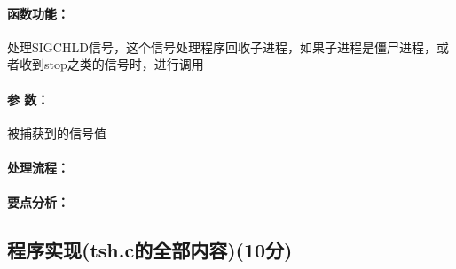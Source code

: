 \paragraph{函数功能：}处理SIGCHLD信号，这个信号处理程序回收子进程，如果子进程是僵尸进程，或者收到stop之类的信号时，进行调用
\paragraph{参   数：}被捕获到的信号值
\paragraph{处理流程：}
\paragraph{要点分析：}

\subsection{程序实现(tsh.c的全部内容)(10分)}
%

\inputminted{c}{../../../Experiment6/tsh.c}
